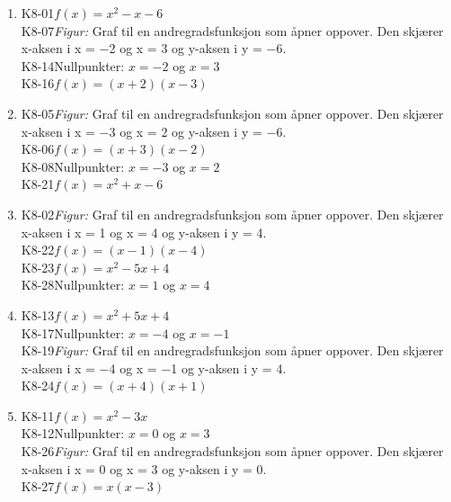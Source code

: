 \documentclass[11pt,a4paper]{article}
\begin{document}
\begin{enumerate}[leftmargin=1.6em, itemsep=0.7em]
\item \begin{minipage}[t]{\linewidth}\textsf{\small K8-01}\quad $f(x) = x^2 - x - 6$ \\ \textsf{\small K8-07}\quad \emph{Figur:} Graf til en andregradsfunksjon som åpner oppover. Den skjærer x-aksen i x = −2 og x = 3 og y-aksen i y = −6. \\ \textsf{\small K8-14}\quad Nullpunkter: $x = -2$ og $x = 3$ \\ \textsf{\small K8-16}\quad $f(x) = (x + 2)(x - 3)$\end{minipage}
\item \begin{minipage}[t]{\linewidth}\textsf{\small K8-05}\quad \emph{Figur:} Graf til en andregradsfunksjon som åpner oppover. Den skjærer x-aksen i x = −3 og x = 2 og y-aksen i y = −6. \\ \textsf{\small K8-06}\quad $f(x) = (x + 3)(x - 2)$ \\ \textsf{\small K8-08}\quad Nullpunkter: $x = -3$ og $x = 2$ \\ \textsf{\small K8-21}\quad $f(x) = x^2 + x - 6$\end{minipage}
\item \begin{minipage}[t]{\linewidth}\textsf{\small K8-02}\quad \emph{Figur:} Graf til en andregradsfunksjon som åpner oppover. Den skjærer x-aksen i x = 1 og x = 4 og y-aksen i y = 4. \\ \textsf{\small K8-22}\quad $f(x) = (x - 1)(x - 4)$ \\ \textsf{\small K8-23}\quad $f(x) = x^2 - 5x + 4$ \\ \textsf{\small K8-28}\quad Nullpunkter: $x = 1$ og $x = 4$\end{minipage}
\item \begin{minipage}[t]{\linewidth}\textsf{\small K8-13}\quad $f(x) = x^2 + 5x + 4$ \\ \textsf{\small K8-17}\quad Nullpunkter: $x = -4$ og $x = -1$ \\ \textsf{\small K8-19}\quad \emph{Figur:} Graf til en andregradsfunksjon som åpner oppover. Den skjærer x-aksen i x = −4 og x = −1 og y-aksen i y = 4. \\ \textsf{\small K8-24}\quad $f(x) = (x + 4)(x + 1)$\end{minipage}
\item \begin{minipage}[t]{\linewidth}\textsf{\small K8-11}\quad $f(x) = x^2 - 3x$ \\ \textsf{\small K8-12}\quad Nullpunkter: $x = 0$ og $x = 3$ \\ \textsf{\small K8-26}\quad \emph{Figur:} Graf til en andregradsfunksjon som åpner oppover. Den skjærer x-aksen i x = 0 og x = 3 og y-aksen i y = 0. \\ \textsf{\small K8-27}\quad $f(x) = x(x - 3)$\end{minipage}

\end{enumerate}
\end{document}
